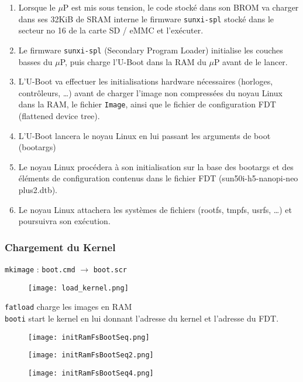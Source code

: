 \begin{enumerate}
\item Lorsque le $\mu$P est mis sous tension, le code stocké dans son BROM va charger dans ses 32KiB de SRAM interne le firmware \verb!sunxi-spl! stocké dans le secteur no 16 de la carte SD / eMMC et l’exécuter. 
\item Le firmware \verb!sunxi-spl! (Secondary Program Loader) initialise les couches basses du $\mu$P, puis charge l'U-Boot dans la RAM du $\mu$P avant de le lancer.
\item L'U-Boot va effectuer les initialisations hardware nécessaires (horloges, contrôleurs, …) avant de charger l’image non compressées du noyau Linux dans la RAM, le fichier \verb!Image!, ainsi que le fichier de configuration FDT (flattened device tree).
\item L'U-Boot lancera le noyau Linux en lui passant les arguments de boot (bootargs)
\item Le noyau Linux procédera à son initialisation sur la base des bootargs et des éléments de configuration contenus dans le fichier FDT (sun50i-h5-nanopi-neo plus2.dtb).
\item Le noyau Linux attachera les systèmes de fichiers (rootfs, tmpfs, usrfs, …) et poursuivra son exécution.
\end{enumerate}

\subsubsection{Chargement du Kernel}
\verb+mkimage+ : \verb+boot.cmd+ $\rightarrow$ \verb+boot.scr+

\begin{figure}[H]
    \centering
    \texttt{[image: load\_kernel.png]}
\end{figure}

\verb+fatload+ charge les images en RAM\\
\verb+booti+ start le kernel en lui donnant l'adresse du kernel et l'adresse du FDT.

\begin{figure}[H]
    \centering
    \texttt{[image: initRamFsBootSeq.png]}
    \label{fig:initRamFsBootSeq}
\end{figure}
\begin{figure}[H]
    \centering
    \texttt{[image: initRamFsBootSeq2.png]}
    \label{fig:initRamFsBootSeq2}
\end{figure}
\begin{figure}[H]
    \centering
    \texttt{[image: initRamFsBootSeq4.png]}
    \label{fig:initRamFsBootSeq4}
\end{figure}